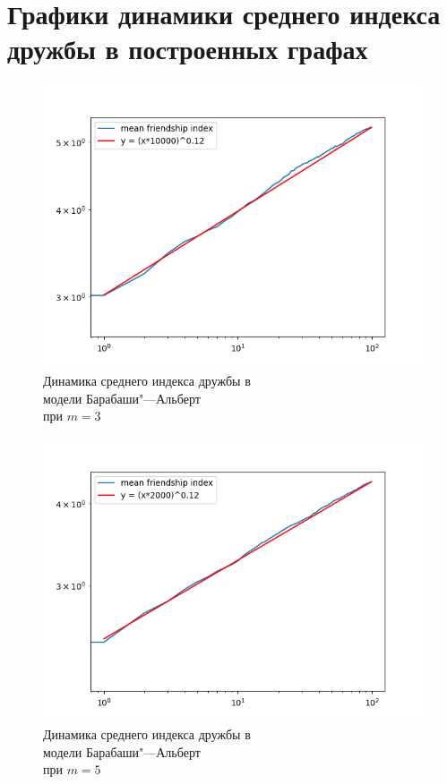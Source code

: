 \documentclass[bachelor, och, diploma]{SCWorks}
\begin{document}
\section{Графики динамики среднего индекса дружбы в построенных графах}\label{app:dyn}
\begin{figure}[!ht]
    \centering
    \includegraphics[scale=0.7]{diploma_results/dynamic_log/ba_mean_beta_3.png}
    \caption{Динамика среднего индекса дружбы  в\\ модели Барабаши"---Альберт\\ при $m=3$}
\end{figure}
\begin{figure}[!ht]
    \centering
    \includegraphics[scale=0.7]{diploma_results/dynamic_log/ba_mean_beta_5.png}
    \caption{Динамика среднего индекса дружбы  в\\ модели Барабаши"---Альберт\\ при $m=5$}
\end{figure}
\end{document}
